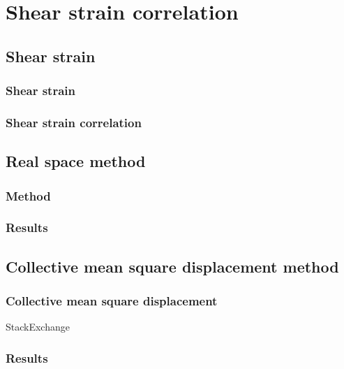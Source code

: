 \documentclass[class=report, float=false, crop=false]{standalone}
\begin{document}
\chapter{Shear strain correlation}
\label{chap:strain}

\section{Shear strain}

\subsection{Shear strain}

\subsection{Shear strain correlation}

\section{Real space method}

\subsection{Method}

\subsection{Results}

\section{Collective mean square displacement method}

\subsection{Collective mean square displacement}

StackExchange \faStackExchange~ \cite{stackexchange}

\subsection{Results}
\end{document}
